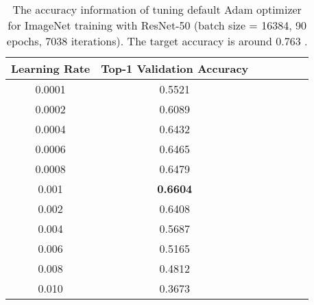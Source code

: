 \documentclass{article} \usepackage{iclr2020_conference,times}
\begin{document}
\begin{table}[ht]
\renewcommand{\arraystretch}{1.3}
\caption{The accuracy information of tuning default Adam optimizer for ImageNet training with ResNet-50 (batch size = 16384, 90 epochs, 7038 iterations). The target accuracy is around 0.763 \citep{goyal2017accurate}.}
\centering
\begin{tabular}{|c|c|c|c|c|c|c|}
\hline
Learning Rate & Top-1 Validation Accuracy \\
\hline
\hline
0.0001 & 0.5521 \\
\hline
0.0002 & 0.6089 \\
\hline
0.0004 & 0.6432 \\
\hline
0.0006 & 0.6465 \\
\hline
0.0008 & 0.6479 \\
\hline
0.001 & {\bf 0.6604} \\
\hline
0.002 & 0.6408 \\
\hline
0.004 & 0.5687 \\
\hline
0.006 & 0.5165 \\
\hline
0.008 & 0.4812 \\
\hline
0.010 & 0.3673 \\
\hline
\end{tabular}
\label{table:imagenet_adam_tuning_1}
\end{table}
\end{document}
